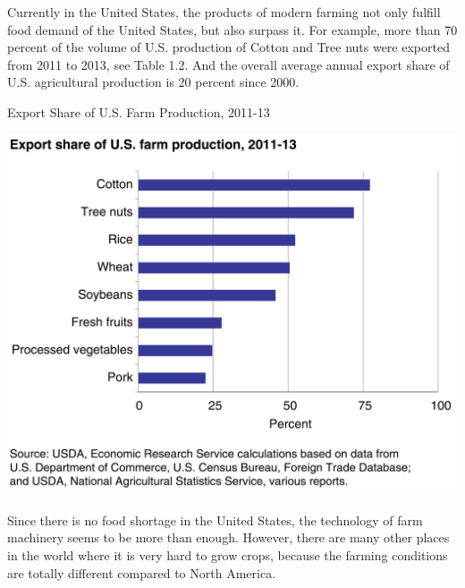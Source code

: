 Currently in the United States, the products of modern farming not only fulfill food demand of the United States, but also surpass it. For example, more than 70 percent of the volume of U.S. production of Cotton and Tree nuts were exported from 2011 to 2013, see Table 1.2. And the overall average annual export share of U.S. agricultural production is 20 percent since 2000. \cite{Exports}
\begin{table}[ht!]
\begin{center}
\caption{Export Share of U.S. Farm Production, 2011-13}
\includegraphics[scale = 0.4]{pics/cropexport.png}
\end{center}
\end{table}
Since there is no food shortage in the United States, the technology of farm machinery seems to be more than enough. However, there are many other places in the world where it is very hard to grow crops, because the farming conditions are totally different compared to North America. 
